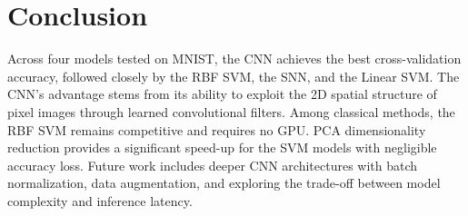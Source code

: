 \documentclass{article}
\begin{document}
\section{Conclusion}

Across four models tested on MNIST, the CNN achieves the best cross-validation accuracy, followed closely by the RBF SVM, the SNN, and the Linear SVM. The CNN's advantage stems from its ability to exploit the 2D spatial structure of pixel images through learned convolutional filters. Among classical methods, the RBF SVM remains competitive and requires no GPU. PCA dimensionality reduction provides a significant speed-up for the SVM models with negligible accuracy loss. Future work includes deeper CNN architectures with batch normalization, data augmentation, and exploring the trade-off between model complexity and inference latency.




\end{document}
